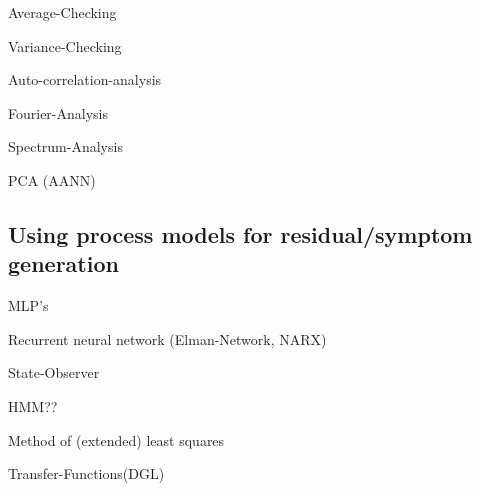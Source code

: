 \documentclass[a4paper,11pt]{article}
\begin{document}
Average-Checking

Variance-Checking

Auto-correlation-analysis

Fourier-Analysis

Spectrum-Analysis

PCA (AANN)


\subsection{Using process models for residual/symptom generation}
  
MLP's

Recurrent neural network (Elman-Network, NARX)

State-Observer

HMM??

Method of (extended) least squares

Transfer-Functions(DGL)
\end{document}
